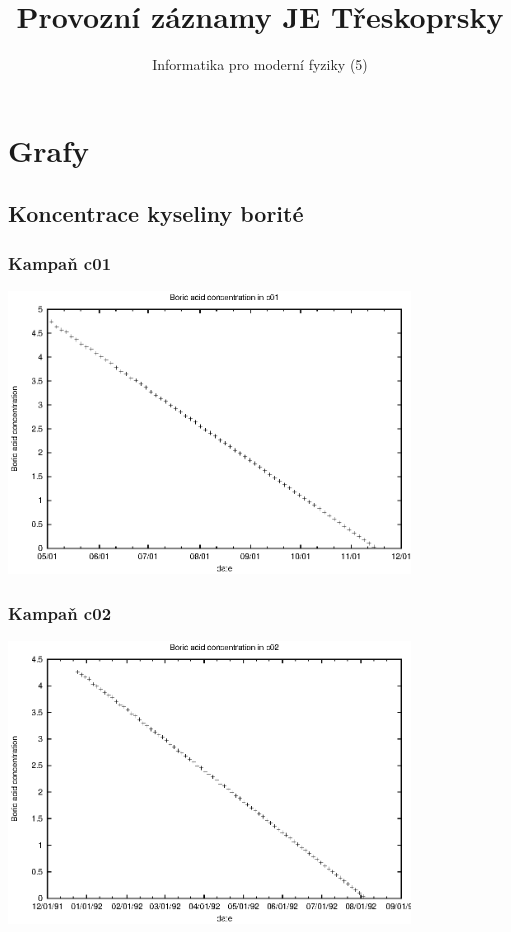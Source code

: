 \documentclass[a4paper,twoside,11pt]{article}
\title{Provozní záznamy JE Třeskoprsky}
\author{Informatika pro moderní fyziky (5)}
\begin{document}
\maketitle

\tableofcontents

\section{Grafy}

\subsection{Koncentrace kyseliny borité}





\subsubsection{Kampaň c01}
\begin{center}
\includegraphics[width=0.8\textwidth]{bc_c01.eps}
\end{center}




\subsubsection{Kampaň c02}
\begin{center}
\includegraphics[width=0.8\textwidth]{bc_c02.eps}
\end{center}
\end{document}
